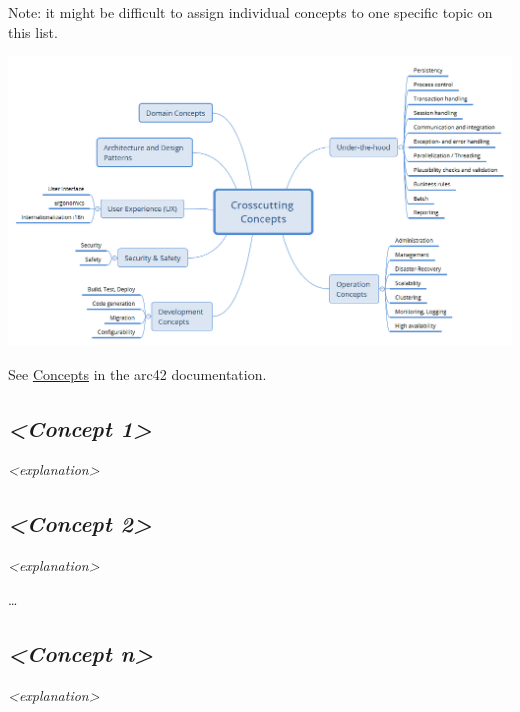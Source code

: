 Note: it might be difficult to assign individual concepts to one
specific topic on this list.

\includegraphics{images/08-Crosscutting-Concepts-Structure-EN.png}

See \href{https://docs.arc42.org/section-8/}{Concepts} in the arc42
documentation.

\hypertarget{__emphasis_concept_1_emphasis}{%
\subsection{\texorpdfstring{\emph{\textless Concept
1\textgreater{}}}{\textless Concept 1\textgreater{}}}\label{__emphasis_concept_1_emphasis}}

\emph{\textless explanation\textgreater{}}

\hypertarget{__emphasis_concept_2_emphasis}{%
\subsection{\texorpdfstring{\emph{\textless Concept
2\textgreater{}}}{\textless Concept 2\textgreater{}}}\label{__emphasis_concept_2_emphasis}}

\emph{\textless explanation\textgreater{}}

\ldots{}

\hypertarget{__emphasis_concept_n_emphasis}{%
\subsection{\texorpdfstring{\emph{\textless Concept
n\textgreater{}}}{\textless Concept n\textgreater{}}}\label{__emphasis_concept_n_emphasis}}

\emph{\textless explanation\textgreater{}}
